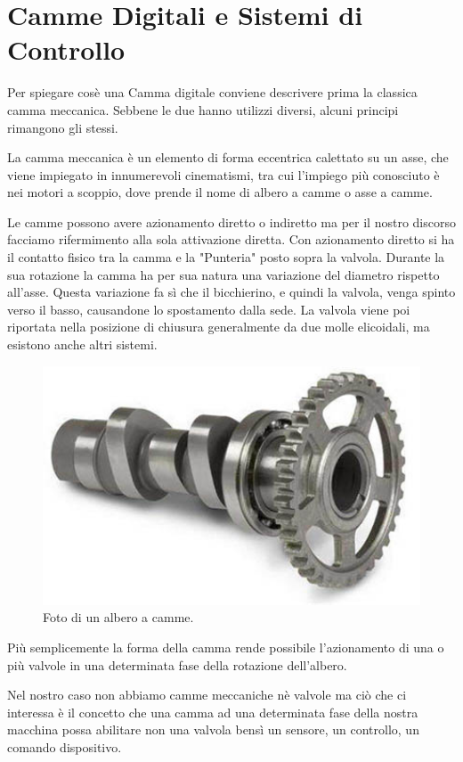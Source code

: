 \documentclass[12pt, a4paper, oneside]{book}
\begin{document}
\section{Camme Digitali e Sistemi di Controllo}
Per spiegare cosè una Camma digitale conviene descrivere prima la classica camma meccanica. Sebbene le due hanno utilizzi diversi, alcuni principi rimangono gli stessi.

La camma meccanica è un elemento di forma eccentrica calettato su un asse, che viene impiegato in innumerevoli cinematismi, tra cui l'impiego più conosciuto è nei motori a scoppio, dove prende il nome di albero a camme o asse a camme.

Le camme possono avere azionamento diretto o indiretto ma per il nostro discorso facciamo rifermimento alla sola attivazione diretta.
Con azionamento diretto si ha il contatto fisico tra la camma e la "Punteria" posto sopra la valvola. Durante la sua rotazione la camma ha per sua natura una variazione del diametro rispetto all'asse. Questa variazione fa sì che il bicchierino, e quindi la valvola, venga spinto verso il basso, causandone lo spostamento dalla sede. La valvola viene poi riportata nella posizione di chiusura generalmente da due molle elicoidali, ma esistono anche altri sistemi.

\begin{figure}[H]
	\centering
	\includegraphics[width=12cm]{Immagini/camme}
	\caption{ Foto di un albero a camme.}
		\label{cam1}
\end{figure}

Più semplicemente la forma della camma rende possibile l'azionamento di una o più valvole in una determinata fase della rotazione dell'albero. 

Nel nostro caso non abbiamo camme meccaniche nè valvole ma ciò che ci interessa è il concetto che una camma ad una determinata fase della nostra macchina possa abilitare non una valvola bensì un sensore, un controllo, un comando dispositivo.
\end{document}
